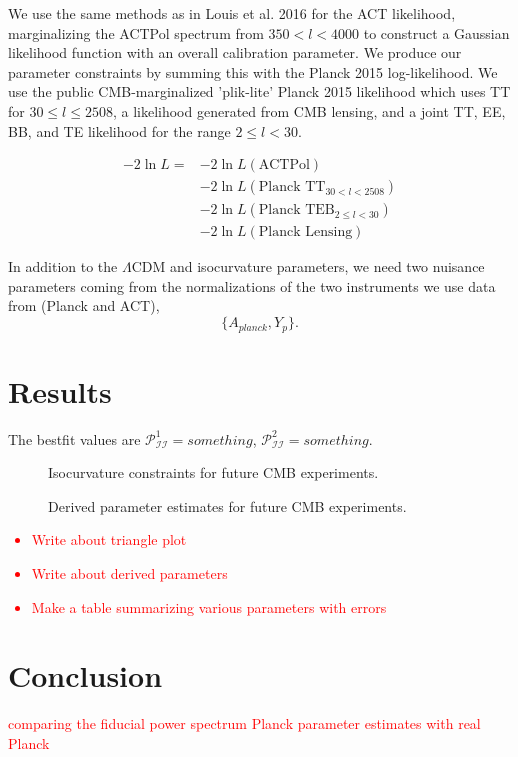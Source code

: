 \documentclass{emulateapj}
\newcommand\writingnote[1]{\textcolor{red}{#1}}
\newcommand\pii{ \mathcal{P}_{\mathcal{I}\mathcal{I}} }
\begin{document}
We use the same methods as in Louis et al. 2016 for the ACT likelihood, marginalizing the ACTPol spectrum from $350 < l < 4000$ to construct a Gaussian likelihood function with an overall calibration parameter. We produce our parameter constraints by summing this with the Planck 2015 log-likelihood. We use the public CMB-marginalized 'plik-lite' Planck 2015 likelihood which uses TT for $30 \leq l \leq 2508$, a likelihood generated from CMB lensing, and a joint TT, EE, BB, and TE likelihood for the range $2 \leq l < 30$.

\begin{align}
-2 \ln L = &- 2 \ln L(\text{ACTPol}) \\
&-2 \ln L(\text{Planck TT}_{30 < l < 2508}) \\
&-2 \ln L(\text{Planck TEB}_{2 \leq l < 30})\\
&-2 \ln L(\text{Planck Lensing})
\end{align}

In addition to the $\Lambda$CDM and isocurvature parameters, we need two nuisance parameters coming from the normalizations of the two instruments we use data from (Planck and ACT),
\begin{equation}
\{ A_{planck}, Y_p \}.
\end{equation}



\section{Results}

The bestfit values are $\pii^1 = something$, $\pii^2 = something$.

\begin{figure}
\caption{Isocurvature constraints for future CMB experiments.\label{fig:triangleplots}}
\end{figure}



\begin{figure}
\caption{Derived parameter estimates for future CMB experiments.\label{fig:derivedparams}}
\end{figure}

\writingnote{
    \begin{itemize}
        \item Write about triangle plot
        \item Write about derived parameters
        \item Make a table summarizing various parameters with errors
    \end{itemize}
}

\section{Conclusion}

\appendix

\writingnote{comparing the fiducial power spectrum Planck parameter estimates with real Planck}


\end{document}
